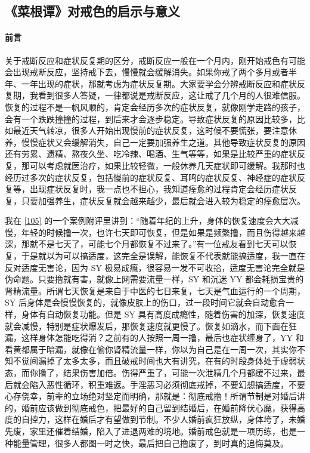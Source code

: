 \subsection{《菜根谭》对戒色的启示与意义}

\paragraph*{前言}

关于戒断反应和症状反复期的区分，戒断反应一般在一个月内，刚开始戒色有可能会出现戒断反应，坚持戒下去，慢慢就会缓解消失。如果你戒了两个多月或者半年、一年出现的症状，那就考虑为症状反复期。大家要学会分辨戒断反应和症状反复期，我看到很多人答疑，一律都说是戒断反应，这让戒了几个月的人很难信服。恢复的过程不是一帆风顺的，肯定会经历多次的症状反复，就像刚学走路的孩子，会有一个跌跌撞撞的过程，到后来才会逐步稳定。导致症状反复的原因比较多，比如最近天气转凉，很多人开始出现慢前的症状反复，这时候不要慌张，要注意休养，慢慢症状又会缓解消失，自己一定要加强养生之道。其他导致症状反复的原因还有劳累、遗精、熬夜久坐、吃冷辣、喝酒、生气等等，如果是比较严重的症状反复，那可以考虑就医治疗，如果比较轻微，一般休养几天症状即可缓解。我那时也经历过多次的症状反复，包括慢前的症状反复、耳鸣的症状反复、神经症的症状反复等，出现症状反复时，我一点也不担心，我知道痊愈的过程肯定会经历症状反复，只要加强养生，症状反复就会越来越少，最后就会进入较为稳定的痊愈层次。

我在 \ref{105} 的一个案例附评里讲到：“随着年纪的上升，身体的恢复速度会大大减慢，年轻的时候撸一次，也许七天即可恢复，但是如果是频繁撸，而且伤得越来越深，那就不是七天了，可能七个月都恢复不过来了。”有一位戒友看到七天可以恢复，于是就以为可以搞适度，这完全是误解，能恢复不代表就能搞适度，我一直在反对适度无害论，因为 SY 极易成瘾，很容易一发不可收拾，适度无害论完全就是伪命题。只要撸就有害，就像上网需要流量一样，SY 和沉迷 YY 都会耗损宝贵的肾精流量。所谓七天恢复是来自于中医的七日来复，七天是气血运行的一个周期，SY 后身体是会慢慢恢复的，就像皮肤上的伤口，过一段时间它就会自动愈合一样，身体有自动恢复功能。但是 SY 具有高度成瘾性，随着伤害的加深，恢复速度就会减慢，特别是症状爆发后，那恢复速度就更慢了。恢复如滴水，而下面在狂漏，这样身体怎能吃得消？之前有的人按照一周一撸，最后也症状缠身了，YY 和看黄都属于暗漏，就像在偷你肾精流量一样，你以为自己是在一周一次，其实你不知不觉间漏掉了太多太多，而且破戒时间也大有讲究，在有的时段身体处于虚弱状态，而你撸了，结果伤害加倍。伤得严重了，可能一次泄精几个月都缓不过来，最后就会陷入恶性循环，积重难返。手淫恶习必须彻底戒掉，不要幻想搞适度，不要心存侥幸，前辈的立场绝对坚定而明确，那就是：彻底戒撸！所谓节制是对婚后讲的，婚前应该做到彻底戒色，把最好的自己留到结婚后，在婚前降伏心魔，获得高度的自控力，这样在婚后才有望做到节制。不少人婚前疯狂放纵，身体垮了，未婚先废，家里还催着结婚，陷入了进退两难的境地。婚前戒色就是一项历练，也是一种能量管理，很多人都图一时之快，最后把自己撸废了，到时真的追悔莫及。

